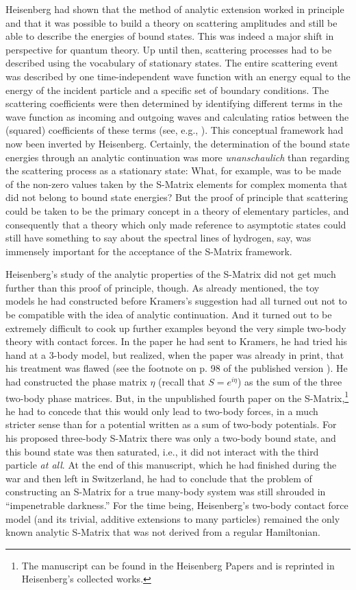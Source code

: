 \documentclass[12pt]{article}
\begin{document}
Heisenberg had shown that the method of analytic extension worked in principle and that it was possible to build a theory on scattering amplitudes and still be able to describe the energies of bound states. This was indeed a major shift in perspective for quantum theory. Up until then, scattering processes had to be described using the vocabulary of stationary states. The entire scattering event was described by one time-independent wave function with an energy equal to the energy of the incident particle and a specific set of boundary conditions. The scattering coefficients were then determined by identifying different terms in the wave function as incoming and outgoing waves and calculating ratios between the (squared) coefficients of these terms (see, e.g., \citep[chapter IX]{dirac_1935_the-principles}). This conceptual framework had now been inverted by Heisenberg. Certainly, the determination of the bound state energies through an analytic continuation was more \emph{unanschaulich} than regarding the scattering process as a stationary state: What, for example, was to be made of the non-zero values taken by the S-Matrix elements for complex momenta that did not belong to bound state energies? But the proof of principle that scattering could be taken to be the primary concept in a theory of elementary particles, and consequently that a theory which only made reference to asymptotic states could still have something to say about the spectral lines of hydrogen, say, was immensely important for the acceptance of the S-Matrix framework.

Heisenberg's study of the analytic properties of the S-Matrix did not get much further than this proof of principle, though. As already mentioned, the toy models he had constructed before Kramers's suggestion had all turned out not to be compatible with the idea of analytic continuation. And it turned out to be extremely difficult to cook up further examples beyond the very simple two-body theory with contact forces. In the paper he had sent to Kramers, he had tried his hand at a 3-body model, but realized, when the paper was already in print, that his treatment was flawed (see the footnote on p. 98 of the published version \citep{heisenberg_1944_die-beobachtbaren}). He had constructed the phase matrix $\eta$ (recall that $S=e^{i \eta}$) as the sum of the three two-body phase matrices. But, in the unpublished fourth paper on the S-Matrix,\footnote{The manuscript can be found in the Heisenberg Papers and is reprinted in Heisenberg's collected works.} he had to concede that this would only lead to two-body forces, in a much stricter sense than for a potential written as a sum of two-body potentials. For his proposed three-body S-Matrix there was only a two-body bound state, and this bound state was then saturated, i.e., it did not interact with the third particle \emph{at all}. At the end of this manuscript, which he had finished during the war and then left in Switzerland, he had to conclude that the problem of constructing an S-Matrix for a true many-body system was still shrouded in ``impenetrable darkness.'' For the time being, Heisenberg's two-body contact force model (and its trivial, additive extensions to many particles) remained the only known analytic S-Matrix that was not derived from a regular Hamiltonian.
\end{document}
